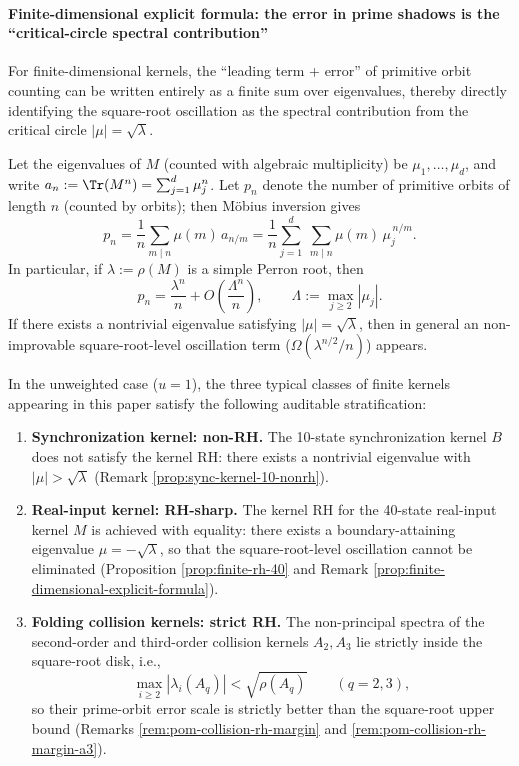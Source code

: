 \paragraph{Finite-dimensional explicit formula: the error in prime shadows is the ``critical-circle spectral contribution''}\label{par:finite-explicit-formula}
For finite-dimensional kernels, the ``leading term + error'' of primitive orbit counting can be written entirely as a finite sum over eigenvalues, thereby directly identifying the square-root oscillation as the spectral contribution from the critical circle \(|\mu|=\sqrt{\lambda}\).
\begin{remark}\label{prop:finite-dimensional-explicit-formula}
Let the eigenvalues of \(M\) (counted with algebraic multiplicity) be \(\mu_1,\dots,\mu_d\), and write
\(
a_n:=\Tr(M^n)=\sum_{j=1}^d \mu_j^n
\).
Let \(p_n\) denote the number of primitive orbits of length \(n\) (counted by orbits); then M\"obius inversion gives
\[
p_n=\frac{1}{n}\sum_{m\mid n}\mu(m)\,a_{n/m}
=\frac{1}{n}\sum_{j=1}^d\ \sum_{m\mid n}\mu(m)\,\mu_j^{\,n/m}.
\]
In particular, if \(\lambda:=\rho(M)\) is a simple Perron root, then
\[
p_n=\frac{\lambda^n}{n}+O\!\left(\frac{\Lambda^n}{n}\right),
\qquad
\Lambda:=\max_{j\ge 2}|\mu_j|.
\]
If there exists a nontrivial eigenvalue satisfying \(|\mu|=\sqrt{\lambda}\), then in general an non-improvable square-root-level oscillation term (\(\Omega(\lambda^{n/2}/n)\)) appears.
\end{remark}

\begin{proposition}\label{prop:rh-stratification-three-kernels}
In the unweighted case ($u=1$), the three typical classes of finite kernels appearing in this paper satisfy the following auditable stratification:
\begin{enumerate}
  \item \textbf{Synchronization kernel: non-RH.} The 10-state synchronization kernel $B$ does not satisfy the kernel RH: there exists a nontrivial eigenvalue with \(|\mu|>\sqrt{\lambda}\) (Remark \ref{prop:sync-kernel-10-nonrh}).
  \item \textbf{Real-input kernel: RH-sharp.} The kernel RH for the 40-state real-input kernel $M$ is achieved with equality: there exists a boundary-attaining eigenvalue \(\mu=-\sqrt{\lambda}\), so that the square-root-level oscillation cannot be eliminated (Proposition \ref{prop:finite-rh-40} and Remark \ref{prop:finite-dimensional-explicit-formula}).
  \item \textbf{Folding collision kernels: strict RH.} The non-principal spectra of the second-order and third-order collision kernels \(A_2,A_3\) lie strictly inside the square-root disk, i.e.,
  \[
  \max_{i\ge 2}|\lambda_i(A_q)|<\sqrt{\rho(A_q)}\qquad(q=2,3),
  \]
  so their prime-orbit error scale is strictly better than the square-root upper bound (Remarks \ref{rem:pom-collision-rh-margin} and \ref{rem:pom-collision-rh-margin-a3}).
\end{enumerate}
\end{proposition}

